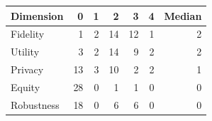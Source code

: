 \begin{tabular}{lrrrrrr}
\toprule
Dimension & 0 & 1 & 2 & 3 & 4 & Median \\
\midrule
Fidelity & 1 & 2 & 14 & 12 & 1 & 2 \\
Utility & 3 & 2 & 14 & 9 & 2 & 2 \\
Privacy & 13 & 3 & 10 & 2 & 2 & 1 \\
Equity & 28 & 0 & 1 & 1 & 0 & 0 \\
Robustness & 18 & 0 & 6 & 6 & 0 & 0 \\
\bottomrule
\end{tabular}
